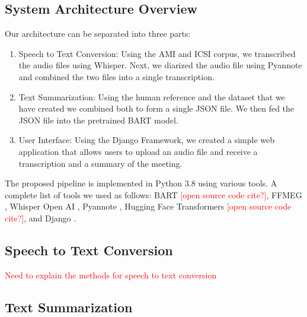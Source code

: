 



\subsection{System Architecture Overview}
\label{sec:overview}

Our architecture can be separated into three parts:

\begin{enumerate}
\item Speech to Text Conversion: Using the AMI and ICSI corpus, we transcribed the audio files using Whisper. Next, we diarized the audio file using Pyannote and combined the two files into a single transcription.

\item Text Summarization: Using the human reference and the dataset that we have created we combined both to form a single JSON file. We then fed the JSON file into the pretrained BART model.

\item User Interface: Using the Django Framework, we created a simple web application that allows users to upload an audio file and receive a transcription and a summary of the meeting.
\end{enumerate}

The proposed pipeline is implemented in Python 3.8 using various tools. A complete list of tools we used as follows: BART \textcolor{red}{[open source code cite?]}, FFMEG \cite{FFmpeg}, Whisper Open AI \cite{whisper}, Pyannote \cite{pyannotewhisper}, Hugging Face Transformers \textcolor{red}{[open source code cite?]}, and Django \cite{Django} . 





\subsection{Speech to Text Conversion}
\label{sec:stc}
\textcolor{red}{Need to explain the methods for speech to text conversion}




\subsection{Text Summarization}
\label{sec:ts}

